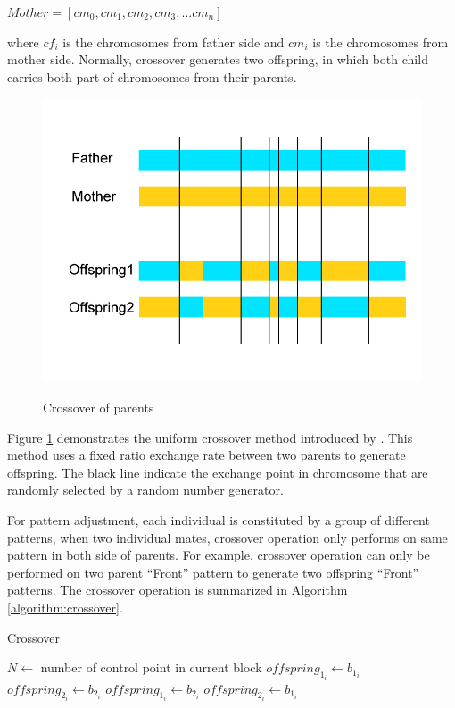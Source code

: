 $Mother = [cm_{0}, cm_{1}, cm_{2}, cm_{3}, ... cm_{n}]$

where $cf_{i}$ is the chromosomes from father side and $cm_{i}$ is the chromosomes from mother side. Normally, crossover generates two offspring, in which both child carries both part of chromosomes from their parents.

\begin{figure}[H]
	\centering
	\includegraphics[width=1.0\columnwidth]{../images/crossover}\\[0.1cm]
    \caption{Crossover of parents}
    \label{figure:crossover}
\end{figure}

Figure \ref{figure:crossover} demonstrates the uniform crossover method introduced by . This method uses a fixed ratio exchange rate between two parents to generate offspring. The black line indicate the exchange point in chromosome that are randomly selected by a random number generator.

For pattern adjustment, each individual is constituted by a group of different patterns, when two individual mates, crossover operation only performs on same pattern in both side of parents. For example, crossover operation can only be performed on two parent ``Front'' pattern to generate two offspring ``Front'' patterns. The crossover operation is summarized in Algorithm \ref{algorithm:crossover}.

\begin{algorithm}
\caption{Crossover}\label{algorithm:crossover}
\begin{algorithmic}[1]
		\State $N \gets$ number of control point in current block
				\State $offspring_{1_{i}} \gets b_{1_{i}}$
				\State $offspring_{2_{i}} \gets b_{2_{i}}$
			\Else
				\State $offspring_{1_{i}} \gets b_{2_{i}}$
				\State $offspring_{2_{i}} \gets b_{1_{i}}$
			\EndIf		
		\EndFor
	\EndFor
	\EndIf
\EndProcedure
\end{algorithmic}
\end{algorithm}

